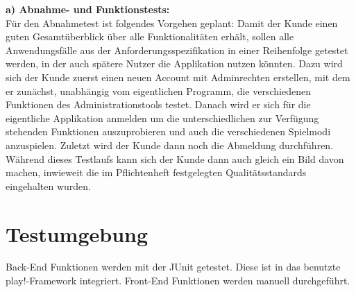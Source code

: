 \textbf{a) Abnahme- und Funktionstests:} \\
Für den Abnahmetest ist folgendes Vorgehen geplant: Damit der Kunde einen guten Gesamtüberblick über alle Funktionalitäten erhält, sollen alle Anwendungsfälle aus der Anforderungsspezifikation in einer Reihenfolge getestet werden, in der auch spätere Nutzer die Applikation nutzen könnten. 
Dazu wird sich der Kunde zuerst einen neuen Account mit Adminrechten erstellen, mit dem er zunächst, unabhängig vom eigentlichen Programm, die verschiedenen Funktionen des Administrationstools testet. Danach wird er sich für die eigentliche Applikation anmelden um die unterschiedlichen zur Verfügung stehenden Funktionen auszuprobieren und auch die verschiedenen Spielmodi anzuspielen. Zuletzt wird der Kunde dann noch die Abmeldung durchführen.
Während dieses Testlaufs kann sich der Kunde dann auch gleich ein Bild davon machen, inwieweit die im Pflichtenheft festgelegten Qualitätsstandards eingehalten wurden.

\section{Testumgebung}
 Back-End Funktionen werden mit der JUnit getestet. Diese ist in das benutzte play!-Framework integriert.
 Front-End Funktionen werden manuell durchgeführt.

